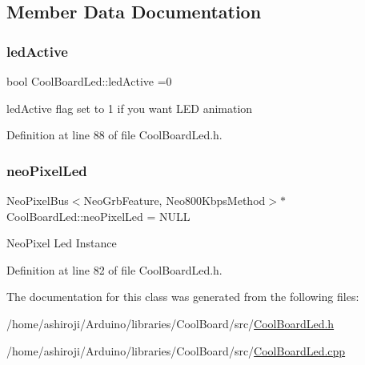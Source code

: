 \subsection{Member Data Documentation}
\mbox{\label{class_cool_board_led_aadd04d2ecf123247718d77f42fba7f08}} 
\subsubsection{\texorpdfstring{led\+Active}{ledActive}}
{\footnotesize\ttfamily bool Cool\+Board\+Led\+::led\+Active =0\hspace{0.3cm}{\ttfamily [private]}}

led\+Active flag set to 1 if you want L\+ED animation 

Definition at line 88 of file Cool\+Board\+Led.\+h.

\mbox{\label{class_cool_board_led_ac2c13fa462a010cd9242bf297c013923}} 
\subsubsection{\texorpdfstring{neo\+Pixel\+Led}{neoPixelLed}}
{\footnotesize\ttfamily Neo\+Pixel\+Bus$<$Neo\+Grb\+Feature, Neo800\+Kbps\+Method$>$$\ast$ Cool\+Board\+Led\+::neo\+Pixel\+Led = N\+U\+LL\hspace{0.3cm}{\ttfamily [private]}}

Neo\+Pixel Led Instance 

Definition at line 82 of file Cool\+Board\+Led.\+h.



The documentation for this class was generated from the following files\+:\begin{DoxyCompactItemize}
\item 
/home/ashiroji/\+Arduino/libraries/\+Cool\+Board/src/\hyperlink{_cool_board_led_8h}{Cool\+Board\+Led.\+h}\item 
/home/ashiroji/\+Arduino/libraries/\+Cool\+Board/src/\hyperlink{_cool_board_led_8cpp}{Cool\+Board\+Led.\+cpp}\end{DoxyCompactItemize}
